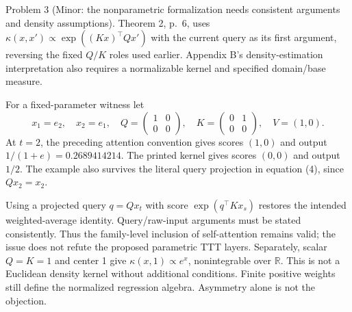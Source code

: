 \documentclass[10pt]{article}
\begin{document}
Problem 3 (Minor: the nonparametric formalization needs consistent arguments and density assumptions).  Theorem 2, p. 6, uses \(\kappa(x,x')\propto\exp((Kx)^\top Qx')\) with the current query as its first argument, reversing the fixed \(Q/K\) roles used earlier. Appendix B’s density-estimation interpretation also requires a normalizable kernel and specified domain/base measure.\par
For a fixed-parameter witness let \[x_1=e_2,\quad x_2=e_1,\quad
 Q=\begin{pmatrix}1&0\\0&0\end{pmatrix},\quad
 K=\begin{pmatrix}0&1\\0&0\end{pmatrix},\quad V=(1,0).\] At \(t=2\), the preceding attention convention gives scores \((1,0)\) and output \(1/(1+e)=0.2689414214\). The printed kernel gives scores \((0,0)\) and output \(1/2\). The example also survives the literal query projection in equation (4), since \(Qx_2=x_2\).\par
Using a projected query \(q=Qx_t\) with score \(\exp(q^\top Kx_s)\) restores the intended weighted-average identity. Query/raw-input arguments must be stated consistently. Thus the family-level inclusion of self-attention remains valid; the issue does not refute the proposed parametric TTT layers. Separately, scalar \(Q=K=1\) and center 1 give \(\kappa(x,1)\propto e^x\), nonintegrable over \(\mathbb R\). This is not a Euclidean density kernel without additional conditions. Finite positive weights still define the normalized regression algebra. Asymmetry alone is not the objection.\par
\end{document}
